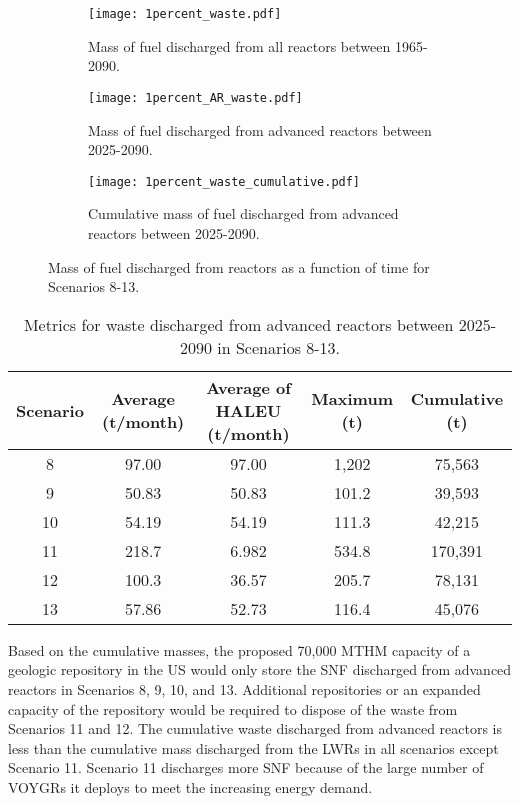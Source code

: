 \begin{figure}
    \centering
    \begin{subfigure}[b]{0.45\textwidth}
        \centering
        \texttt{[image: 1percent\_waste.pdf]}
        \caption{Mass of fuel discharged from all reactors between 
        1965-2090.}
        \label{fig:1percent_all_waste}
    \end{subfigure}
    \hfill
    \begin{subfigure}[b]{0.45\textwidth}
        \centering
        \texttt{[image: 1percent\_AR\_waste.pdf]}
        \caption{Mass of fuel discharged from advanced reactors 
        between 2025-2090.}
        \label{fig:1percent_AR_waste}
    \end{subfigure}
    \begin{subfigure}[b]{0.45\textwidth}
        \centering
        \texttt{[image: 1percent\_waste\_cumulative.pdf]}
        \caption{Cumulative mass of fuel discharged from advanced reactors 
        between 2025-2090.}
        \label{fig:1percent_waste_cumulative}
    \end{subfigure}
       \caption{Mass of fuel discharged from reactors 
       as a function of time for Scenarios 8-13. }
       \label{fig:1percent_waste}
\end{figure}

\begin{table}
    \centering 
    \caption{Metrics for waste discharged from advanced reactors 
    between 2025-2090 in Scenarios 8-13.}
    \label{tab:1percent_waste}
    \begin{tabular}{c c c c c}
        \hline
        Scenario & Average (t/month) & Average of \gls{HALEU} (t/month) 
        & Maximum (t) & Cumulative (t)\\\hline
        8 & 97.00 & 97.00 & 1,202 & 75,563 \\
        9 & 50.83 & 50.83 & 101.2 & 39,593 \\
        10 & 54.19 & 54.19 & 111.3 & 42,215 \\
        11 & 218.7 & 6.982 & 534.8 & 170,391 \\
        12 & 100.3 & 36.57 & 205.7 & 78,131 \\
        13 & 57.86 & 52.73 & 116.4 & 45,076 \\
        \hline
    \end{tabular}
\end{table}

Based on the cumulative masses, the proposed 70,000 MTHM capacity of 
a geologic repository in the US would only store the \gls{SNF} 
discharged from advanced reactors in Scenarios 8, 9, 10, and 13. Additional 
repositories or an expanded capacity of the repository would be required 
to dispose of the waste from Scenarios 11 and 12. The 
cumulative waste discharged from advanced reactors is less than the 
cumulative mass discharged from the \glspl{LWR} in all scenarios except 
Scenario 11. Scenario 11 discharges more \gls{SNF} because of the large 
number of VOYGRs it deploys to meet the increasing energy demand. 

